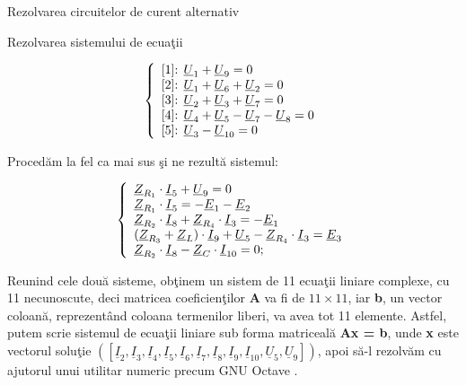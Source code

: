 \documentclass[a4paper]{article}
\begin{document}
\begin{section}{Rezolvarea circuitelor de curent alternativ}
\begin{subsection}{Rezolvarea sistemului de ecua\c tii \\}
\begin{itemize}
	 \begin{large} \[ \left\{ \begin{array}{ll}
		$[1]: $ \underline{U}_1 + \underline{U}_9 = 0 \\
		$[2]: $ \underline{U}_1 + \underline{U}_6 + \underline{U}_2  = 0 \\
		$[3]: $ \underline{U}_2 + \underline{U}_3 + \underline{U}_7 = 0 \\
		$[4]: $ \underline{U}_4 + \underline{U}_5 - \underline{U}_7 - \underline{U}_8 = 0 \\
		$[5]: $ \underline{U}_3 - \underline{U}_{10} = 0 \\
	\end{array} \right. \] \end{large}

	Proced\u am la fel ca mai sus \c si ne rezult\u a sistemul:

	 \begin{large} \[ \left\{ \begin{array}{ll}
		\underline{Z}_{R_1} \cdot \underline{I}_5 + \underline{U}_9 = 0 \\
		\underline{Z}_{R_1} \cdot \underline{I}_5 = - \underline{E}_1 - \underline{E}_2 \\
		\underline{Z}_{R_2} \cdot \underline{I}_8 + \underline{Z}_{R_4} \cdot \underline{I}_3 =  - \underline{E}_1 \\
		(\underline{Z}_{R_3} + \underline{Z}_L) \cdot \underline{I}_9 + \underline{U}_5 - \underline{Z}_{R_4} \cdot \underline{I}_3 = \underline{E}_3 \\
		\underline{Z}_{R_2} \cdot \underline{I}_{8} - \underline{Z}_C \cdot \underline{I}_{10} = 0;  \par
	\end{array} \right. \] \end{large}

	Reunind cele dou\u a sisteme, ob\c tinem un sistem de 11 ecua\c tii liniare complexe, cu 11 necunoscute, deci matricea coeficien\c tilor \textbf{A} va fi de $ 11 \times 11 $, iar \textbf{b}, un vector coloan\u a, reprezent\^ and coloana termenilor liberi, va avea tot 11 elemente. Astfel, putem scrie sistemul de ecua\c tii liniare sub forma matriceal\u a \textbf{Ax = b}, unde \textbf{x} este vectorul solu\c tie $ ( [\underline{I}_2, \underline{I}_3, \underline{I}_4, \underline{I}_5, \underline{I}_6, \underline{I}_7, \underline{I}_8, \underline{I}_9, \underline{I}_{10}, \underline{U}_5, \underline{U}_9] ) $, apoi s\u a-l rezolv\u am cu ajutorul unui utilitar numeric precum GNU Octave \cite{label2}.
	

\end{itemize}
\end{subsection}
\end{section}
\end{document}
